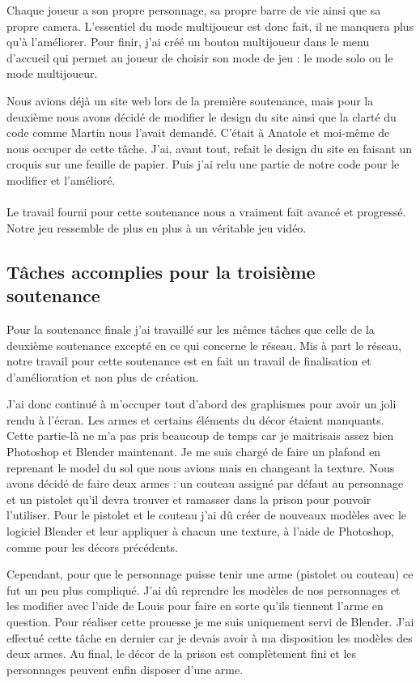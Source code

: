 \documentclass[12pt]{article}
\begin{document}
Chaque joueur a son propre personnage, sa propre barre de vie ainsi que sa propre camera. L'essentiel du mode multijoueur est donc fait, il ne manquera plus qu'à l'améliorer. Pour finir, j'ai créé un bouton multijoueur dans le menu d'accueil qui permet au joueur de choisir son mode de jeu : le mode solo ou le mode multijoueur.

Nous avions déjà un site web lors de la première soutenance, mais pour la deuxième nous avons décidé de modifier le design du site ainsi que la clarté du code comme Martin nous l'avait demandé. C'était à Anatole et moi-même de nous occuper de cette tâche. J'ai, avant tout, refait le design du site en faisant un croquis sur une feuille de papier. Puis j'ai relu une partie de notre code pour le modifier et l'amélioré.
\\
\\


Le travail fourni pour cette soutenance nous a vraiment fait avancé et progressé. Notre jeu ressemble de plus en plus à un véritable jeu vidéo.

\subsection{Tâches accomplies pour la troisième soutenance}
Pour la soutenance finale j'ai travaillé sur les mêmes tâches que celle de la deuxième soutenance excepté en ce qui concerne le réseau. Mis à part le réseau, notre travail pour cette soutenance est en fait un travail de finalisation et d'amélioration et non plus de création.

J'ai donc continué à m'occuper tout d'abord des graphismes pour avoir un joli rendu à l'écran. Les armes et certains éléments du décor étaient manquants. Cette partie-là ne m’a pas pris beaucoup de temps car je maitrisais assez bien Photoshop et Blender maintenant. Je me suis chargé de faire un plafond en reprenant le model du sol que nous avions mais en changeant la texture. Nous avons décidé de faire deux armes : un couteau assigné par défaut au personnage et un pistolet qu’il devra trouver et ramasser dans la prison pour pouvoir l’utiliser. Pour le pistolet et le couteau j’ai dû créer de nouveaux modèles avec le logiciel Blender et leur appliquer à chacun une texture, à l’aide de Photoshop, comme pour les décors précédents.

Cependant, pour que le personnage puisse tenir une arme (pistolet ou couteau) ce fut un peu plus compliqué. J’ai dû reprendre les modèles de nos personnages et les modifier avec l’aide de Louis pour faire en sorte qu’ils tiennent l’arme en question. Pour réaliser cette prouesse je me suis uniquement servi de Blender. J’ai effectué cette tâche en dernier car je devais avoir à ma disposition les modèles des deux armes. Au final, le décor de la prison est complètement fini et les personnages peuvent enfin disposer d’une arme.
\end{document}
